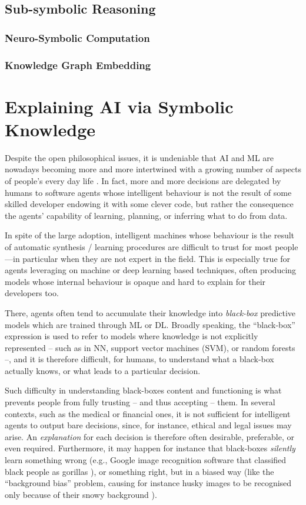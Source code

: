 \documentclass[12pt,a4paper,openright,twoside]{book}
\begin{document}
\section{Sub-symbolic Reasoning}

\subsection{Neuro-Symbolic Computation}

\subsection{Knowledge Graph Embedding}

\chapter{Explaining AI via Symbolic Knowledge}

Despite the open philosophical issues, it is undeniable that AI and ML are nowadays becoming more and more intertwined with a growing number of aspects of people's every day life \cite{helbing2019, elliott2019}. 
%
In fact, more and more decisions are delegated by humans to software agents whose intelligent behaviour is not the result of some skilled developer endowing it with some clever code, but rather the consequence the agents' capability of learning, planning, or inferring what to do from data.

In spite of the large adoption, intelligent machines whose behaviour is the result of automatic synthesis / learning procedures are difficult to trust for most people---in particular when they are not expert in the field.
%
This is especially true for agents leveraging on machine or deep learning based techniques, often producing models whose internal behaviour is opaque and hard to explain for their developers too.

There, agents often tend to accumulate their knowledge into \emph{black-box} predictive models which are trained through ML or DL.
%
Broadly speaking, the ``black-box'' expression is used to refer to models where knowledge is not explicitly represented -- such as in NN, support vector machines (SVM), or random forests --, and it is therefore difficult, for humans, to understand what a black-box actually knows, or what leads to a particular decision.

Such difficulty in understanding black-boxes content and functioning is what prevents people from fully trusting -- and thus accepting -- them.
%
In several contexts, such as the medical or financial ones, it is not sufficient for intelligent agents to output bare decisions, since, for instance, ethical and legal issues may arise. 
%
An \emph{explanation} for each decision is therefore often desirable, preferable, or even required.  
%
Furthermore, it may happen for instance that black-boxes \emph{silently} learn something wrong (e.g., Google image recognition software that classified black people as gorillas \cite{fourcade2017, crawford2016artificial}), or something right, but in a biased way (like  the ``background bias'' problem, causing for instance husky images to be recognised only because of their snowy background \cite{RibeiroSG16}).
\end{document}
